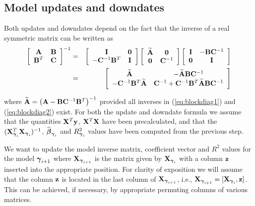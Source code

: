 \subsection{Model updates and downdates} 

\noindent
Both updates and downdates depend on the fact that
the inverse of a real symmetric matrix can be written as
\begin{eqnarray}
	\displaystyle \left[ \begin{array}{cc}
		{\bf A}   & {\bf B} \\
		{\bf B}^T & {\bf C}
	\end{array} \right]^{-1}
	&  = &
	\displaystyle \left[ \begin{array}{cc}
		{\bf I} & {\bf 0} \\
		-{\bf C}^{-1}{\bf B}^T &  {\bf I}
	\end{array} \right]
	\left[ \begin{array}{cc}
		\widetilde{{\bf A}} & {\bf 0} \\
		{\bf 0} & {\bf C}^{-1}
	\end{array} \right]
	\left[ \begin{array}{cc}
		{\bf I}    & -{\bf B}{\bf C}^{-1}\\
		{\bf 0} & {\bf I}
	\end{array} \right] \label{eq:blockdiag1}\\
	&  = &
	\displaystyle\left[
	\begin{array}{cc}
		\widetilde{{\bf A}}
		& - \widetilde{{\bf A}}{\bf B}{\bf C}^{-1} \\
		-{\bf C}^{-1}{\bf B}^T\widetilde{{\bf A}}
		& {\bf C}^{-1} + {\bf C}^{-1}{\bf B}^T\widetilde{{\bf A}}{\bf B}{\bf C}^{-1}
	\end{array}\right]\label{eq:blockdiag2}
\end{eqnarray}

\noindent where $\widetilde{{\bf A}} = \left({\bf A}-{\bf B}{\bf C}^{-1}{\bf B}^T\right)^{-1}$
provided all inverses in (\ref{eq:blockdiag1}) and
(\ref{eq:blockdiag2}) exist. 
For both the update and downdate formula we assume that the quantities
${\bf X}^T{\bf y}$, ${\bf X}^T{\bf X}$ have been precalculated, and that the $({\bf X}_{{\boldsymbol \gamma}_i}^T{\bf X}_{{\boldsymbol \gamma}_i})^{-1}$, 
$\widehat{{\boldsymbol \beta}}_{{\boldsymbol \gamma}_i}$ and $R_{{\boldsymbol \gamma}_i}^2$ values have been computed from the previous step.

We want to update the model inverse matrix, coefficient vector and $R^2$ values for the model ${\boldsymbol \gamma}_{i+1}$ where ${\bf X}_{{\boldsymbol \gamma}_{i+1}}$ is the matrix given by ${\bf X}_{{\boldsymbol \gamma}_i}$ with a column ${\bf z}$ inserted into the appropriate position.
For clarity of exposition we will assume that the column ${\bf z}$ is located in the last column of ${\bf X}_{{\boldsymbol \gamma}_{i+1}}$, i.e., ${\bf X}_{{\boldsymbol \gamma}_{i+1}} = [{\bf X}_{{\boldsymbol \gamma}_{i}},{\bf z}]$. This can be achieved, if necessary, by appropriate permuting  columns of various matrices.

